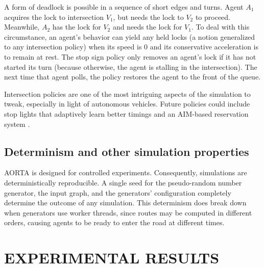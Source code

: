 \documentclass[letterpaper, 10 pt, conference]{ieeeconf}  %
\begin{document}
A form of deadlock is possible in a sequence of short edges and turns. Agent
$A_1$ acquires the lock to intersection $V_1$, but needs the lock to $V_2$ to
proceed. Meanwhile, $A_2$ has the lock for $V_2$ and needs the lock for $V_1$.
To deal with this circumstance, an agent's behavior can yield any held locks (a
notion generalized to any intersection policy) when its speed is $0$ and its
conservative acceleration is to remain at rest. The stop sign policy only
removes an agent's lock if it has not started its turn (because otherwise, the
agent is stalling in the intersection). The next time that agent polls, the
policy restores the agent to the front of the queue.



Intersection policies are one of the most intriguing aspects of the simulation to
tweak, especially in light of autonomous vehicles. Future policies could include stop lights that adaptively learn better
timings and an AIM-based reservation system \cite{JAIR08-dresner}.

\subsection{Determinism and other simulation properties}

AORTA is designed for controlled experiments. Consequently, simulations are
deterministically reproducible. A single seed for the pseudo-random number
generator, the input graph, and the generators' configuration completely
determine the outcome of any simulation. This determinism does break down when
generators use worker threads, since routes may be computed in different orders,
causing agents to be ready to enter the road at different times.



 


\section{EXPERIMENTAL RESULTS}
\end{document}
